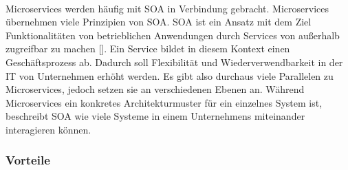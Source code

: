 \\
Microservices werden häufig mit \ac{SOA} in Verbindung gebracht. Microservices übernehmen viele Prinzipien von \ac{SOA}. \ac{SOA} ist ein Ansatz mit dem Ziel Funktionalitäten von betrieblichen Anwendungen durch Services von außerhalb zugreifbar zu machen [\cite[S. 2]{wolffMicroservices2018}]. Ein Service bildet in diesem Kontext einen Geschäftsprozess ab. Dadurch soll Flexibilität und Wiederverwendbarkeit in der IT von Unternehmen erhöht werden. Es gibt also durchaus viele Parallelen zu Microservices, jedoch setzen sie an verschiedenen Ebenen an. Während Microservices ein konkretes Architekturmuster für ein einzelnes System ist, beschreibt \ac{SOA} wie viele Systeme in einem Unternehmens miteinander interagieren können.

\subsubsection{Vorteile}

